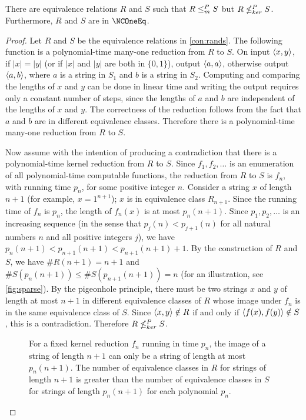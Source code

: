 \begin{theorem}\label{thm:different}
  There are equivalence relations $R$ and $S$ such that $R \leq^{P}_{m} S$ but $R \nleq^{P}_{ker} S$.
  Furthermore, $R$ and $S$ are in $\NCOneEq$.
\end{theorem}
\begin{proof}
  Let $R$ and $S$ be the equivalence relations in \autoref{con:rands}.
  The following function is a polynomial-time many-one reduction from $R$ to $S$.
  On input $\langle x,y\rangle$, if $|x| = |y|$ (or if $|x|$ and $|y|$ are both in $\{0, 1\}$), output $\langle a,a\rangle$, otherwise output $\langle a,b\rangle$, where $a$ is a string in $S_1$ and $b$ is a string in $S_2$.
  Computing and comparing the lengths of $x$ and $y$ can be done in linear time and writing the output requires only a constant number of steps, since the lengths of $a$ and $b$ are independent of the lengths of $x$ and $y$.
  The correctness of the reduction follows from the fact that $a$ and $b$ are in different equivalence classes.
  Therefore there is a polynomial-time many-one reduction from $R$ to $S$.

  Now assume with the intention of producing a contradiction that there is a polynomial-time kernel reduction from $R$ to $S$.
  Since $f_1, f_2, \dotsc$ is an enumeration of all polynomial-time computable functions, the reduction from $R$ to $S$ is $f_n$, with running time $p_n$, for some positive integer $n$.
  Consider a string $x$ of length $n + 1$ (for example, $x = 1^{n + 1}$); $x$ is in equivalence class $R_{n + 1}$.
  Since the running time of $f_n$ is $p_n$, the length of $f_n(x)$ is at most $p_n(n + 1)$.
  Since $p_1, p_2, \dotsc$ is an increasing sequence (in the sense that $p_j(n) < p_{j + 1}(n)$ for all natural numbers $n$ and all positive integers $j$), we have $p_n(n + 1) < p_{n + 1}(n + 1) < p_{n + 1}(n + 1) + 1$.
  By the construction of $R$ and $S$, we have $\#R(n + 1) = n + 1$ and $\#S(p_n(n + 1)) \leq \#S(p_{n + 1}(n + 1)) = n$ (for an illustration, see \autoref{fig:sparse}).
  By the pigeonhole principle, there must be two strings $x$ and $y$ of length at most $n + 1$ in different equivalence classes of $R$ whose image under $f_n$ is in the same equivalence class of $S$.
  Since $\langle x,y\rangle \notin R$ if and only if $\langle f(x),f(y)\rangle \notin S$, this is a contradiction.
  Therefore $R \nleq^{P}_{ker} S$.

  \begin{figure}
    \caption{\label{fig:sparse}For a fixed kernel reduction $f_n$ running in time $p_n$, the image of a string of length $n + 1$ can only be a string of length at most $p_n(n + 1)$.
      The number of equivalence classes in $R$ for strings of length $n + 1$ is greater than the number of equivalence classes in $S$ for strings of length $p_n(n + 1)$ for each polynomial $p_n$.}
    \begin{center}
\end{center}
\end{figure}
\end{proof}
